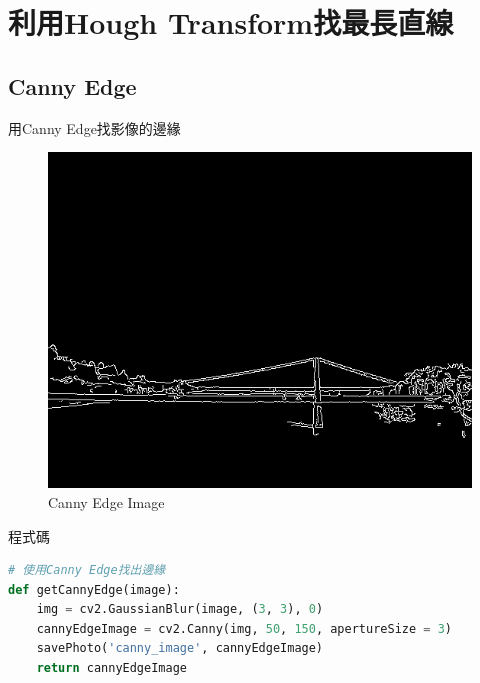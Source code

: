 \documentclass[12pt,a4paper]{article}
\begin{document}
\section{利用Hough Transform找最長直線}
\subsection{Canny Edge}
{
用Canny Edge找影像的邊緣
\begin{figure}[ht]
\centering
\includegraphics[width=.6\textwidth]{image/canny_image.png}
\caption{Canny Edge Image}%
\label{要合併的兩張圖}%
\end{figure}

\newpage
程式碼
\begin{lstlisting}[language=Python]
# 使用Canny Edge找出邊緣
def getCannyEdge(image):
    img = cv2.GaussianBlur(image, (3, 3), 0)
    cannyEdgeImage = cv2.Canny(img, 50, 150, apertureSize = 3)
    savePhoto('canny_image', cannyEdgeImage)
    return cannyEdgeImage

\end{lstlisting}
}
\end{document}
